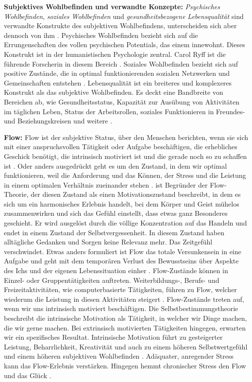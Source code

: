 \par
\textbf{Subjektives Wohlbefinden und verwandte Konzepte:} \textit{Psychisches Wohlbefinden}, \textit{soziales Wohlbefinden} und \textit{gesundheitsbezogene Lebensqualität} sind verwandte Konstrukte des subjektiven Wohlbefindens, unterscheiden sich aber dennoch von ihm \cite{Carr2011}. Psychisches Wohlbefinden bezieht sich auf die Errungenschaften des vollen psychischen Potentials, das einem innewohnt. Dieses Konstrukt ist in der humanistischen Psychologie zentral. Carol Ryff ist die führende Forscherin in diesem Bereich \cite{Ryff1989}. Soziales Wohlbefinden bezieht sich auf positive Zustände, die in optimal funktionierenden sozialen Netzwerken und Gemeinschaften entstehen \cite{Keyes1998}. Lebensqualität ist ein breiteres und komplexeres Konstrukt als das subjektive Wohlbefinden. Es deckt eine Bandbreite von Bereichen ab, wie Gesundheitsstatus, Kapazität zur Ausübung von Aktivitäten im täglichen Leben, Status der Arbeitsrollen, soziales Funktionieren in Freundes- und Beziehungskreisen und weitere \cite{Preedy2010}. 
\par
\textbf{Flow:}
Flow ist der subjektive Status, über den Menschen berichten, wenn sie sich mit einer anspruchsvollen Tätigkeit oder Aufgabe beschäftigen, die erhebliches Geschick benötigt, die intrinsisch motiviert ist und die gerade noch so zu schaffen ist \cite{Nakamura2009}. Oder anders ausgedrückt geht es um den Zustand, in dem wir optimal funktionieren, weil die Anforderung und das Können, der Stress und die Leistung in einem optimalen Verhältnis zueinander stehen \cite{Esch2014}.  ist Begründer der Flow-Theorie, der diesen Zustand als einen Motivationszustand beschreibt, in dem es sich um ein harmonisches Erlebnis handelt, bei dem Körper und Geist mühelos zusammenwirken und sich das Gefühl einstellt, dass etwas ganz Besonderes geschieht. Er wird ausgelöst durch die völlige Konzentration auf das Handeln und endet in einem Zustand der Selbstvergessenheit. In diesem Zustand haben alltägliche Gedanken und Sorgen keine Relevanz mehr. Das Zeitgefühl verschwindet. Etwas anders formuliert ist Flow das totale Versunkensein in eine Aufgabe und geht mit dem temporären Verlust des Bewusstseins über Aspekte des Ichs und der eigenen Lebenssituation einher \cite{Nakamura2009}. Flow-Zustände können in Einzel- oder Gruppentätigkeiten auftreten. Weiterbildungs-, Berufs- und Freizeitaktivitäten, wie computerbasierte Tätigkeiten, führen zu Flow, welcher wiederum die Leistung in diesen Aktivitäten steigert \cite{Carr2011}. Flow-Zustände treten auf, wenn wir uns intrinsisch motiviert beschäftigen. Die Selbstbestimmungstheorie beschreibt die intrinsische Motivation als Tätigkeit, in welcher wir Dinge machen, die wir gerne machen. Bei extrinsisch motivierten Tätigkeiten hingegen, erwarten wir ein spezifisches Resultat. Intrinsische Motivation führt zu gesteigerter Leistung, Beharrlichkeit, Kreativität und auch zu einem höheren Selbstwertgefühl und einem höheren subjektiven Wohlbefinden \cite{Deci1985}. Adäquater, anregender Stress kann das Flow-Erlebnis verstärken. Hingegen hemmt chronischer Stress den Flow und das Glück \cite{Esch2014}.

